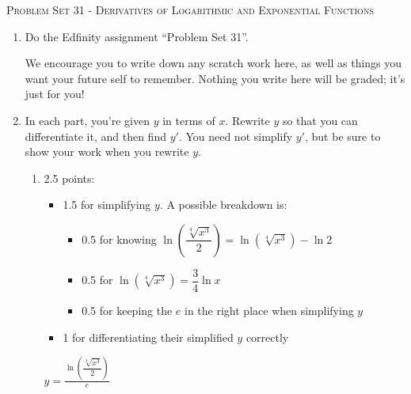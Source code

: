 \documentclass{article}
\newcommand{\doedfinity}[2][\newpage]{
  \begin{problem}[#1]
    Do the Edfinity assignment ``Problem Set #2''.

    We encourage you to write down any scratch work here, as well as
    things you want your future self to remember. Nothing you write
    here will be graded; it's just for you!
  \end{problem}
}
\begin{document}
\begin{center}
  \large\textsc{Problem Set 31 - Derivatives of Logarithmic and Exponential Functions}
\end{center}

\begin{enumerate}
\item  {}

  \doedfinity{31}

\item  In each part, you're given $y$ in terms of $x$. Rewrite $y$ so that you can differentiate it, and then find $y'$. You need not simplify $y'$, but be sure to show your work when you rewrite $y$.

  \begin{enumerate}
  \item

    \begin{grading}
      2.5 points:
      \begin{itemize}[nosep]
      \item 1.5 for simplifying $y$. A possible breakdown is:
        \begin{itemize}[nosep]
        \item 0.5 for knowing $\ln \left( \dfrac{\sqrt[4]{x^3}}{2} \right) = \ln \left( \sqrt[4]{x^3} \right) - \ln 2$
        \item 0.5 for $\ln \left( \sqrt[4]{x^3} \right) = \dfrac{3}{4} \ln x$
        \item 0.5 for keeping the $e$ in the right place when simplifying $y$
        \end{itemize}
      \item 1 for differentiating their simplified $y$ correctly
      \end{itemize}
    \end{grading}

    \begin{problem}[\vfill]
      $\displaystyle y = \frac{\ln \left( \dfrac{\sqrt[4]{x^3}}{2} \right)}{e}$
    \end{problem}


\end{enumerate}
\end{enumerate}
\end{document}
